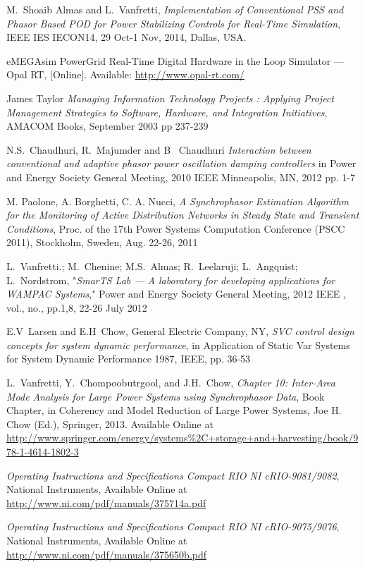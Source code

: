 \documentclass[conference]{IEEEtran}
\begin{document}
\begin{thebibliography}{1}
 M.~Shoaib Almas and L.~Vanfretti, \emph{Implementation of Conventional PSS and Phasor Based POD for Power Stabilizing Controls for Real-Time Simulation}, IEEE IES IECON14, 29 Oct-1 Nov, 2014, Dallas, USA.

 eMEGAsim PowerGrid Real-Time Digital Hardware in the Loop Simulator — Opal RT, [Online]. Available: \url{http://www.opal-rt.com/}

 James Taylor \emph{Managing Information Technology Projects : Applying Project Management Strategies to Software, Hardware, and Integration Initiatives}, AMACOM Books, September 2003 pp 237-239

 N.S.~Chaudhuri, R.~Majumder and B~ Chaudhuri \emph{Interaction between conventional and adaptive phasor power oscillation damping controllers} in Power and Energy Society General Meeting, 2010 IEEE Minneapolis, MN, 2012 pp. 1-7

 M. Paolone, A. Borghetti, C. A. Nucci, \emph{A Synchrophasor Estimation Algorithm for the Monitoring of Active Distribution Networks in Steady State and Transient Conditions}, Proc. of the 17th Power Systems Computation Conference (PSCC 2011), Stockholm, Sweden, Aug. 22-26, 2011 

 L.~Vanfretti.; M.~Chenine; M.S.~Almas; R.~Leelaruji; L.~Angquist; L.~Nordstrom, "\emph{SmarTS Lab — A laboratory for developing applications for WAMPAC Systems}," Power and Energy Society General Meeting, 2012 IEEE , vol., no., pp.1,8, 22-26 July 2012

 E.V~Larsen and E.H~Chow, General Electric Company, NY, \emph{SVC control design concepts for system dynamic performance}, in Application of Static Var Systems for System Dynamic Performance 1987, IEEE, pp. 36-53

  L.~Vanfretti, Y.~Chompoobutrgool, and J.H.~Chow, \emph{Chapter 10: Inter-Area Mode Analysis for Large Power Systems using Synchrophasor Data}, Book Chapter, in Coherency and Model Reduction of Large Power Systems, Joe H. Chow (Ed.), Springer, 2013. Available Online at \url{http://www.springer.com/energy/systems\%2C+storage+and+harvesting/book/978-1-4614-1802-3}

 \emph{Operating Instructions and Specifications Compact RIO NI cRIO-9081/9082}, National Instruments, Available Online at \url{http://www.ni.com/pdf/manuals/375714a.pdf}
  
 \emph{Operating Instructions and Specifications Compact RIO NI cRIO-9075/9076}, National Instruments, Available Online at \url{http://www.ni.com/pdf/manuals/375650b.pdf}


\end{thebibliography}
\end{document}
